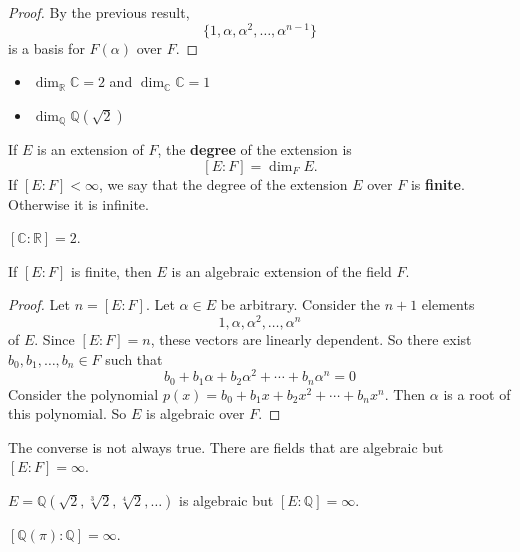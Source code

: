 \begin{proof}
	By the previous result,
	$$\{1,\alpha,\alpha^2,\hdots,\alpha^{n-1}\}$$
	is a basis for $F(\alpha)$ over $F$.
\end{proof}

\begin{example}\phantom{x}
	\begin{itemize}
		\item $\dim_{\mathbb R}\mathbb C=2$ and $\dim_{\mathbb C}\mathbb C=1$
		\item $\dim_{\mathbb Q}\mathbb Q(\sqrt 2)$
	\end{itemize}
\end{example}

\begin{definition}[degree]
	If $E$ is an extension of $F$, the \textbf{degree} of the extension is
	$$[E:F]=\dim_FE.$$
	If $[E:F]<\infty$, we say that the degree of the extension $E$ over $F$ is \textbf{finite}. Otherwise it is infinite.
\end{definition}

\begin{example}
	$[\mathbb C:\mathbb R]=2$.
\end{example}

\begin{theorem}
	If $[E:F]$ is finite, then $E$ is an algebraic extension of the field $F$.
\end{theorem}

\begin{proof}
	Let $n=[E:F]$. Let $\alpha\in E$ be arbitrary. Consider the $n+1$ elements
	$$1,\alpha,\alpha^2,\hdots,\alpha^n$$
	of $E$. Since $[E:F]=n$, these vectors are linearly dependent. So there exist $b_0,b_1,\hdots,b_n\in F$ such that
	$$b_0+b_1\alpha+b_2\alpha^2+\cdots+b_n\alpha^n=0$$
	Consider the polynomial $p(x)=b_0+b_1x+b_2x^2+\cdots+b_nx^n$. Then $\alpha$ is a root of this polynomial. So $E$ is algebraic over $F$.
\end{proof}

\begin{remark}
	The converse is not always true. There are fields that are algebraic but $[E:F]=\infty$.
\end{remark}

\begin{example}
	$E=\mathbb Q(\sqrt 2,\sqrt[3]{2},\sqrt[4]{2},\hdots)$ is algebraic but $[E:\mathbb Q]=\infty$.
\end{example}

\begin{example}
	$[\mathbb Q(\pi):\mathbb Q]=\infty$.
\end{example}

